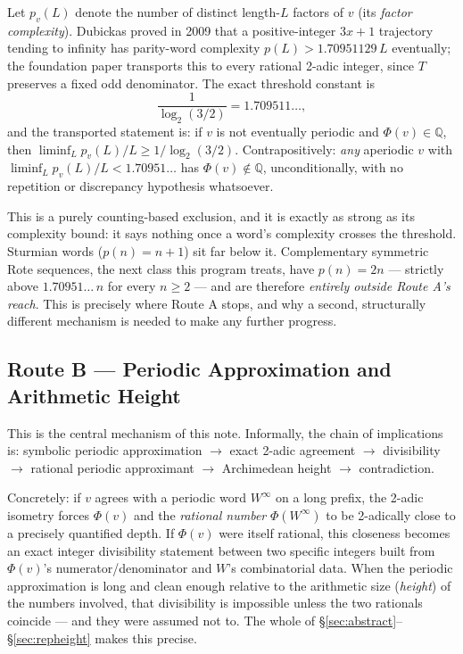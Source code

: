 \documentclass[11pt]{article}
\newcommand{\Q}{\mathbb{Q}}
\begin{document}
Let $p_v(L)$ denote the number of distinct length-$L$ factors of $v$ (its \emph{factor complexity}). Dubickas proved in 2009 \cite{Dubickas2009} that a positive-integer $3x+1$ trajectory tending to infinity has parity-word complexity $p(L) > 1.70951129\,L$ eventually; the foundation paper transports this to every rational 2-adic integer, since $T$ preserves a fixed odd denominator. The exact threshold constant is
\[
\frac{1}{\log_2(3/2)} = 1.709511\ldots,
\]
and the transported statement is: if $v$ is not eventually periodic and $\Phi(v)\in\Q$, then $\liminf_L p_v(L)/L \ge 1/\log_2(3/2)$. Contrapositively: \emph{any} aperiodic $v$ with $\liminf_L p_v(L)/L < 1.70951\ldots$ has $\Phi(v)\notin\Q$, unconditionally, with no repetition or discrepancy hypothesis whatsoever.

This is a purely counting-based exclusion, and it is exactly as strong as its complexity bound: it says nothing once a word's complexity crosses the threshold. Sturmian words ($p(n)=n+1$) sit far below it. Complementary symmetric Rote sequences, the next class this program treats, have $p(n)=2n$ --- strictly above $1.70951\ldots\,n$ for every $n\ge 2$ --- and are therefore \emph{entirely outside Route A's reach}. This is precisely where Route A stops, and why a second, structurally different mechanism is needed to make any further progress.

\subsection{Route B --- Periodic Approximation and Arithmetic Height}
\label{sec:routeB}

This is the central mechanism of this note. Informally, the chain of implications is: symbolic periodic approximation $\to$ exact 2-adic agreement $\to$ divisibility $\to$ rational periodic approximant $\to$ Archimedean height $\to$ contradiction.

Concretely: if $v$ agrees with a periodic word $W^\infty$ on a long prefix, the 2-adic isometry forces $\Phi(v)$ and the \emph{rational number} $\Phi(W^\infty)$ to be 2-adically close to a precisely quantified depth. If $\Phi(v)$ were itself rational, this closeness becomes an exact integer divisibility statement between two specific integers built from $\Phi(v)$'s numerator/denominator and $W$'s combinatorial data. When the periodic approximation is long and clean enough relative to the arithmetic size (\emph{height}) of the numbers involved, that divisibility is impossible unless the two rationals coincide --- and they were assumed not to. The whole of \S\ref{sec:abstract}--\S\ref{sec:repheight} makes this precise.
\end{document}
